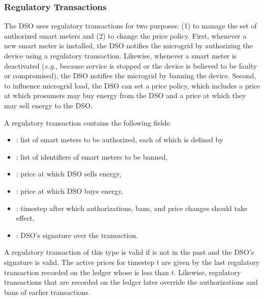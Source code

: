 \subsubsection{Regulatory Transactions}

The DSO uses regulatory transactions for two purposes: (1) to manage
the set of authorized smart meters and (2) to change the price policy.
First, whenever a new smart meter is installed, the DSO notifies the
microgrid by authorizing the device using a regulatory transaction.
Likewise, whenever a smart meter is deactivated (\emph{e.g.}, because
service is stopped or the device is believed to be faulty or
compromised), the DSO notifies the microgrid by banning the device.
Second, to influence microgrid load, the DSO can set a price policy,
which includes a price at which prosumers may buy energy from the DSO
and a price at which they may sell energy to the DSO.

A regulatory transaction contains the following fields:
\begin{itemize}[noitemsep,topsep=-\parskip]
\item {}: list of smart meters to be authorized, each
  of which is defined by
\item {}: list of identifiers of smart meters to be banned, 
\item {}: price at which DSO sells energy,
\item {}: price at which DSO buys energy,
\item {}: timestep after which authorizations, bans, and price changes should take effect,
\item {}: DSO's signature over the transaction.
\end{itemize}
\vspace{\parskip}

A regulatory transaction of this type is valid if  is
not in the past and the DSO's signature is valid.  The active prices
for timestep $t$ are given by the last regulatory transaction recorded
on the ledger whose  is less than $t$.  Likewise,
regulatory transactions that are recorded on the ledger later override
the authorizations and bans of earlier transactions.

